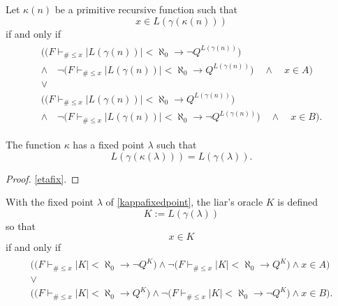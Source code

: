 \documentclass[letterpaper]{article}
\newcommand{\Theorem}{\raisebox{0.5ex}{\large\Beam}}
\begin{document}
\begin{construction}
	Let $\kappa(n)$ be a primitive recursive function such that
	\begin{equation}
	x\in L(\gamma(\kappa(n)))
	\end{equation}
	if and only if
	\begin{align}
	\begin{gathered}\label{okappa1}
	\Big(\big(F\vdash_{\#\le x}|L(\gamma(n))|<\aleph_0\longrightarrow \lnot Q^{L(\gamma(n))}\big)
	\\\land\quad\lnot\big(F\vdash_{\#\le x}|L(\gamma(n))|<\aleph_0\longrightarrow Q^{L(\gamma(n))}\big)
	\quad\land\quad x\in A\Big) \\
	\lor\\
	\Big(\big(F\vdash_{\#\le x}|L(\gamma(n))|<\aleph_0\longrightarrow Q^{L(\gamma(n))}\big)
	\\\land\quad\lnot\big(F\vdash_{\#\le x}|L(\gamma(n))|<\aleph_0\longrightarrow \lnot Q^{L(\gamma(n))}\big)
	\quad\land\quad x\in B\Big).
	\end{gathered}
	\end{align}
\end{construction}
\begin{theorem}\label{kappafixedpoint}
	The function $\kappa$ has a fixed point $\lambda$ such that
	\begin{equation}
	L(\gamma(\kappa(\lambda)))=L(\gamma(\lambda)).
	\end{equation}
\end{theorem}
\begin{proof}
	\Theorem \ref{etafix}.
\end{proof}
\begin{construction}\label{constructk}
	With the fixed point $\lambda$ of \Theorem \ref{kappafixedpoint}, the liar's oracle $K$ is defined
	\begin{equation}
	K:=L(\gamma(\lambda))
	\end{equation}
	so that
	\begin{equation}\label{skappa0}
	x\in K
	\end{equation}
	if and only if
	\begin{align}
	\begin{gathered}\label{skappa1}
	\Big(\big(F\vdash_{\#\le x}|K|<\aleph_0\longrightarrow \lnot Q^K\big)
	\land\lnot\big(F\vdash_{\#\le x}|K|<\aleph_0\longrightarrow Q^K\big)
	\land x\in A\Big) \\
	\lor\\
	\Big(\big(F\vdash_{\#\le x}|K|<\aleph_0\longrightarrow Q^K\big)
	\land\lnot\big(F\vdash_{\#\le x}|K|<\aleph_0\longrightarrow \lnot Q^K\big)
	\land x\in B\Big).
	\end{gathered}
	\end{align}
\end{construction}
\end{document}
